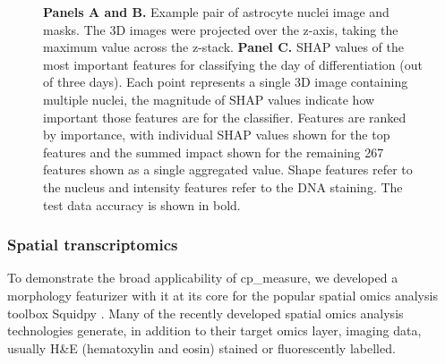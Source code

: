 \documentclass{article}
\begin{document}
\begin{figure}[htbp]
\centering

\caption{\label{fig:astrocytes}\textbf{Panels A and B.} Example pair of astrocyte nuclei image and masks. The 3D images were projected over the z-axis, taking the maximum value across the z-stack. \textbf{Panel C.} SHAP values of the most important features for classifying the day of differentiation (out of three days). Each point represents a single 3D image containing multiple nuclei, the magnitude of SHAP values indicate how important those features are for the classifier. Features are ranked by importance, with individual SHAP values shown for the top features and the summed impact shown for the remaining 267 features shown as a single aggregated value. Shape features refer to the nucleus and intensity features refer to the DNA staining. The test data accuracy is shown in bold.}
\end{figure}

\subsubsection{Spatial transcriptomics}
\label{sec:org5711d86}
To demonstrate the broad applicability of cp\_measure, we developed a morphology featurizer with it at its core for the popular spatial omics analysis toolbox Squidpy \citep{pallaSquidpyScalableFramework2022}.
Many of the recently developed spatial omics analysis technologies generate, in addition to their target omics layer, imaging data, usually H\&E (hematoxylin and eosin) stained or fluorescently labelled. 

\end{document}
